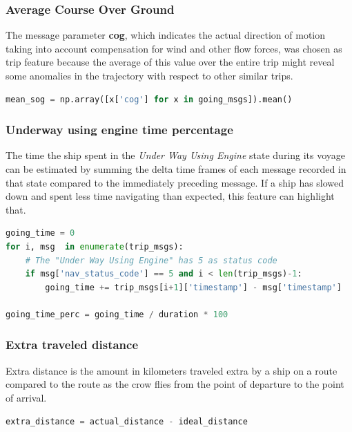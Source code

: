     \subsubsection{Average Course Over Ground}
    
    The message parameter \textbf{cog}, which indicates the actual direction of motion taking into account compensation for wind and other flow forces, was chosen as trip feature because the average of this value over the entire trip might reveal some anomalies in the trajectory with respect to other similar trips.
    
    \begin{lstlisting}[language=Python]
mean_sog = np.array([x['cog'] for x in going_msgs]).mean()
    \end{lstlisting} 
    
    \subsubsection{Underway using engine time percentage}
    The time the ship spent in the \textit{Under Way Using Engine} state during its voyage can be estimated by summing the delta time frames of each message recorded in that state compared to the immediately preceding message. If a ship has slowed down and spent less time navigating than expected, this feature can highlight that.
    
    \begin{lstlisting}[language=Python]
going_time = 0
for i, msg  in enumerate(trip_msgs):
    # The "Under Way Using Engine" has 5 as status code 
    if msg['nav_status_code'] == 5 and i < len(trip_msgs)-1:
        going_time += trip_msgs[i+1]['timestamp'] - msg['timestamp']
        
going_time_perc = going_time / duration * 100
    \end{lstlisting} 

    \subsubsection{Extra traveled distance}
    Extra distance is the amount in kilometers traveled extra by a ship on a route compared to the route as the crow flies from the point of departure to the point of arrival.
    
        \begin{lstlisting}[language=Python]
extra_distance = actual_distance - ideal_distance
    \end{lstlisting}
    

